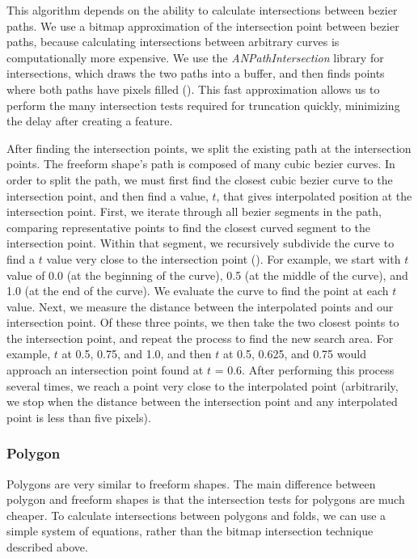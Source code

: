 This algorithm depends on the ability to calculate intersections between
bezier paths. We use a bitmap approximation of the intersection point
between bezier paths, because calculating intersections between
arbitrary curves is computationally more expensive. We use the
\emph{ANPathIntersection} library for intersections, which draws the two
paths into a buffer, and then finds points where both paths have pixels
filled (\citet{ANPathIntersection}). This fast approximation allows us
to perform the many intersection tests required for truncation quickly,
minimizing the delay after creating a feature.

After finding the intersection points, we split the existing path at the
intersection points. The freeform shape's path is composed of many cubic
bezier curves. In order to split the path, we must first find the
closest cubic bezier curve to the intersection point, and then find a
value, \(t\), that gives interpolated position at the intersection
point. First, we iterate through all bezier segments in the path,
comparing representative points to find the closest curved segment to
the intersection point. Within that segment, we recursively subdivide
the curve to find a \(t\) value very close to the intersection point
(\citet{phillips1997casteljau}). For example, we start with \(t\) value
of 0.0 (at the beginning of the curve), 0.5 (at the middle of the
curve), and 1.0 (at the end of the curve). We evaluate the curve to find
the point at each \(t\) value. Next, we measure the distance between the
interpolated points and our intersection point. Of these three points,
we then take the two closest points to the intersection point, and
repeat the process to find the new search area. For example, \(t\) at
0.5, 0.75, and 1.0, and then \(t\) at 0.5, 0.625, and 0.75 would
approach an intersection point found at \(t\) = 0.6. After performing
this process several times, we reach a point very close to the
interpolated point (arbitrarily, we stop when the distance between the
intersection point and any interpolated point is less than five pixels).

\subsubsection{Polygon}\label{polygon}

Polygons are very similar to freeform shapes. The main difference
between polygon and freeform shapes is that the intersection tests for
polygons are much cheaper. To calculate intersections between polygons
and folds, we can use a simple system of equations, rather than the
bitmap intersection technique described above.

